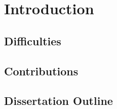 \chapter{Introduction}
\section{Difficulties}
\section{Contributions}  
\section{Dissertation Outline}
